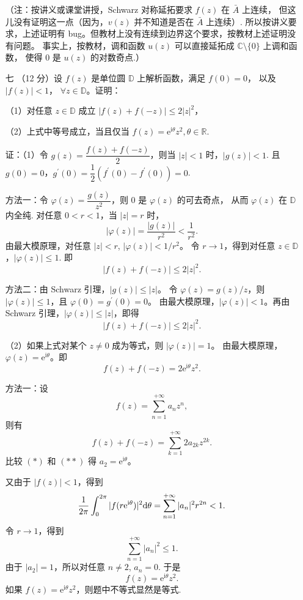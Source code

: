 \begin{enumerate}
（注：按讲义或课堂讲授，Schwarz 对称延拓要求 $f(z)$ 在 $\bar{A}$ 上连续，
但这儿没有证明这一点（因为，$v(z)$ 并不知道是否在 $\bar{A}$ 上连续）.
所以按讲义要求，上述证明有 bug。但教材上没有连续到边界这个要求，按教材上述证明没有问题。
事实上，按教材，调和函数 $u(z)$ 可以直接延拓成 $\mathbb{C} \setminus \{0\}$ 上调和函数，
使得 $0$ 是 $u(z)$ 的对数奇点.）

\item[七]（12 分）设 $f(z)$ 是单位圆 $\mathbb{D}$ 上解析函数，满足 $f(0)=0$，
以及 $|f(z)|<1$， $\forall z \in \mathbb{D}$。证明：

（1）对任意 $z \in \mathbb{D}$ 成立 $|f(z)+f(-z)| \leq 2|z|^{2}$，

（2）上式中等号成立，当且仅当 $f(z)=\mathrm{e}^{\mathrm{i} \theta} z^{2}, \theta \in \mathbb{R}$.

证：（1）令 $g(z)=\dfrac{f(z)+f(-z)}{2}$，则当 $|z|<1$ 时，$|g(z)|<1$. 
且 $g(0)=0$，$g^{\prime}(0)=\dfrac{1}{2}(f^{\prime}(0)-f^{\prime}(0))=0$.

方法一：令 $\varphi(z)=\dfrac{g(z)}{z^{2}}$，则 $0$ 是 $\varphi(z)$ 的可去奇点，
从而 $\varphi(z)$ 在 $\mathbb{D}$ 内全纯. 对任意 $0<r<1$，当 $|z|=r$ 时，
$$|\varphi(z)|=\frac{|g(z)|}{r^{2}}<\frac{1}{r^{2}}.$$
由最大模原理，对任意 $|z|<r$, $|\varphi(z)|<1/r^{2}$。
令 $r \rightarrow 1$，得到对任意 $z \in \mathbb{D}$，$|\varphi(z)| \leq 1$. 即
$$|f(z)+f(-z)| \leq 2|z|^{2}.$$

方法二：由 Schwarz 引理，$|g(z)| \leq|z|$。
令 $\varphi(z)=g(z) / z$，则 $|\varphi(z)| \leq 1$，且 $\varphi(0)=g^{\prime}(0)=0$。
由最大模原理，$|\varphi(z)|<1$。再由 Schwarz 引理，$|\varphi(z)| \leq|z|$，即得
$$|f(z)+f(-z)| \leq 2|z|^{2}.$$

（2）如果上式对某个 $z \neq 0$ 成为等式，则 $|\varphi(z)|=1$。
由最大模原理，$\varphi(z)=\mathrm{e}^{\mathrm{i} \theta}$。即
$$f(z)+f(-z)=2 \mathrm{e}^{\mathrm{i} \theta} z^{2} \tag{$*$}.$$

方法一：设
$$f(z)=\sum_{n=1}^{+\infty} a_{n} z^{n},$$
则有
$$f(z)+f(-z)=\sum_{k=1}^{+\infty} 2 a_{2k} z^{2k}. \tag{$**$}$$
比较 $(*)$ 和 $(**)$ 得 $a_{2}=\mathrm{e}^{\mathrm{i} \theta}$。

又由于 $|f(z)|<1$，得到
$$\frac{1}{2 \pi} \int_{0}^{2 \pi}|f(r \mathrm{e}^{\mathrm{i} \theta})|^{2} {\rm d} \theta
=\sum_{n=1}^{+\infty}|a_{n}|^{2} r^{2 n}<1.$$
令 $r \rightarrow 1$，得到
$$\sum_{n=1}^{+\infty}|a_{n}|^{2} \leq 1.$$
由于 $\left|a_{2}\right|=1$，所以对任意 $n \neq 2$, $a_{n}=0$. 于是
$$f(z)=\mathrm{e}^{\mathrm{i} \theta} z^{2}.$$
如果 $f(z)=\mathrm{e}^{\mathrm{i} \theta} z^{2}$，则题中不等式显然是等式.


\end{enumerate}
